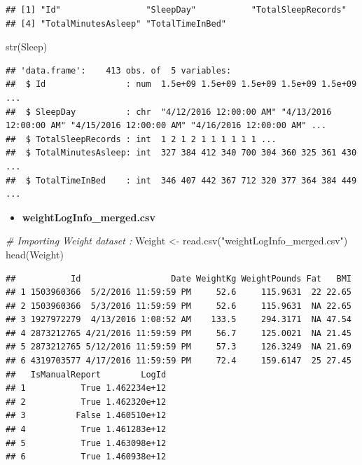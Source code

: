 \documentclass[
]{article}
\newenvironment{Shaded}{\begin{snugshade}}{\end{snugshade}}
\newcommand{\CommentTok}[1]{\textcolor[rgb]{0.56,0.35,0.01}{\textit{#1}}}
\newcommand{\FunctionTok}[1]{\textcolor[rgb]{0.00,0.00,0.00}{#1}}
\newcommand{\NormalTok}[1]{#1}
\newcommand{\OtherTok}[1]{\textcolor[rgb]{0.56,0.35,0.01}{#1}}
\newcommand{\StringTok}[1]{\textcolor[rgb]{0.31,0.60,0.02}{#1}}
\providecommand{\tightlist}{%
  \setlength{\itemsep}{0pt}\setlength{\parskip}{0pt}}
\begin{document}
\begin{verbatim}
## [1] "Id"                 "SleepDay"           "TotalSleepRecords" 
## [4] "TotalMinutesAsleep" "TotalTimeInBed"
\end{verbatim}

\begin{Shaded}
\begin{Highlighting}[]
\FunctionTok{str}\NormalTok{(Sleep)}
\end{Highlighting}
\end{Shaded}

\begin{verbatim}
## 'data.frame':    413 obs. of  5 variables:
##  $ Id                : num  1.5e+09 1.5e+09 1.5e+09 1.5e+09 1.5e+09 ...
##  $ SleepDay          : chr  "4/12/2016 12:00:00 AM" "4/13/2016 12:00:00 AM" "4/15/2016 12:00:00 AM" "4/16/2016 12:00:00 AM" ...
##  $ TotalSleepRecords : int  1 2 1 2 1 1 1 1 1 1 ...
##  $ TotalMinutesAsleep: int  327 384 412 340 700 304 360 325 361 430 ...
##  $ TotalTimeInBed    : int  346 407 442 367 712 320 377 364 384 449 ...
\end{verbatim}

\begin{itemize}
\tightlist
\item
  \textbf{weightLogInfo\_merged.csv}
\end{itemize}

\begin{Shaded}
\begin{Highlighting}[]
\CommentTok{\# Importing Weight dataset :}
\NormalTok{Weight }\OtherTok{\textless{}{-}} \FunctionTok{read.csv}\NormalTok{(}\StringTok{"weightLogInfo\_merged.csv"}\NormalTok{)}
\FunctionTok{head}\NormalTok{(Weight)}
\end{Highlighting}
\end{Shaded}

\begin{verbatim}
##           Id                  Date WeightKg WeightPounds Fat   BMI
## 1 1503960366  5/2/2016 11:59:59 PM     52.6     115.9631  22 22.65
## 2 1503960366  5/3/2016 11:59:59 PM     52.6     115.9631  NA 22.65
## 3 1927972279  4/13/2016 1:08:52 AM    133.5     294.3171  NA 47.54
## 4 2873212765 4/21/2016 11:59:59 PM     56.7     125.0021  NA 21.45
## 5 2873212765 5/12/2016 11:59:59 PM     57.3     126.3249  NA 21.69
## 6 4319703577 4/17/2016 11:59:59 PM     72.4     159.6147  25 27.45
##   IsManualReport        LogId
## 1           True 1.462234e+12
## 2           True 1.462320e+12
## 3          False 1.460510e+12
## 4           True 1.461283e+12
## 5           True 1.463098e+12
## 6           True 1.460938e+12
\end{verbatim}
\end{document}
